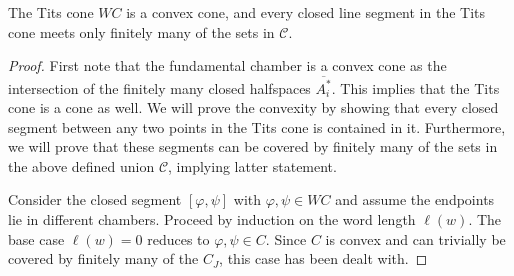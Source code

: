 \begin{theorem}\label{thm:convexity}
    The Tits cone \(WC\) is a convex cone, and every closed line segment in the Tits cone meets only finitely many of the sets in \(\mathcal{C}\).
\end{theorem}
\begin{proof}
    First note that the fundamental chamber is a convex cone as the intersection of the finitely many closed halfspaces \(\overline{A_i^*}\).
    This implies that the Tits cone is a cone as well.
    We will prove the convexity by showing that every closed segment between any two points in the Tits cone is contained in it.
    Furthermore, we will prove that these segments can be covered by finitely many of the sets in the above defined union \(\mathcal{C}\), implying latter statement.

    Consider the closed segment \([\varphi, \psi]\) with \(\varphi, \psi \in WC\) and assume the endpoints lie in different chambers. %
    Proceed by induction on the word length \(\ell(w)\). %
    The base case \(\ell(w) = 0\) reduces to \(\varphi, \psi \in C\).
    Since \(C\) is convex and can trivially be covered by finitely many of the \(C_J\), this case has been dealt with.
    

\end{proof}
